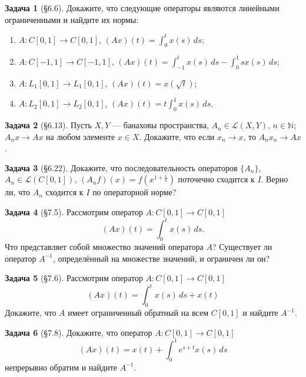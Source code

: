\documentclass{article}
\theoremstyle{definition}
\newtheorem{problem}{Задача}
\newcommand{\N}{\mathbb N}
\begin{document}
\begin{problem}[\S 6.6]
Докажите, что следующие операторы являются линейными ограниченными и найдите их нормы:
\begin{enumerate}
\item $A\colon C[0,1] \to C[0,1]$, \quad $(Ax)(t) = \int_0^t x(s)\, ds$;
\item $A\colon C[-1,1] \to C[-1,1]$, \quad $(Ax)(t) = \int_{-1}^t x(s)\, ds - \int_{0}^1 sx(s)\, ds$;
\item $A\colon L_1[0,1] \to L_1[0,1]$, \quad $(Ax)(t) = x(\sqrt{t})$;
\item $A\colon L_2[0,1] \to L_2[0,1]$, \quad $(Ax)(t) = t\int_0^1 x(s)\, ds$.
\end{enumerate}
\end{problem}

\begin{problem}[\S 6.13]
Пусть $X,Y$ --- банаховы пространства, $A_n \in \mathcal L(X,Y)$, $n\in \N$;
$A_n x \to Ax$ на любом элементе $x\in X$. Докажите, что если $x_n \to x$, то $A_n x_n \to A x$.
\end{problem}

\begin{problem}[\S 6.22]
Докажите, что последовательность операторов $\{A_n\}$, $A_n \in \mathcal L(C[0,1])$,
$(A_n f)(x) = f(x^{1+\frac{1}{n}})$ поточечно сходится к $I$.
Верно ли, что $A_n$ сходится к $I$ по операторной норме?
\end{problem}

\begin{problem}[\S 7.5]
Рассмотрим оператор $A\colon C[0,1] \to C[0,1]$
\begin{equation*}
(Ax)(t) = \int_0^t x(s) \, ds.
\end{equation*}
Что представляет собой множество значений оператора $A$?
Существует ли оператор $A^{-1}$, определённый на множестве значений,
и ограничен ли он?
\end{problem}

\begin{problem}[\S 7.6]
Рассмотрим оператор $A\colon C[0,1] \to C[0,1]$
\begin{equation*}
(Ax)(t) = \int_0^t x(s) \, ds + x(t)
\end{equation*}
Докажите, что $A$ имеет ограниченный обратный на всем $C[0,1]$ и найдите $A^{-1}$.
\end{problem}

\begin{problem}[\S 7.8]
Докажите, что оператор $A\colon C[0,1]\to C[0,1]$
\begin{equation*}
(Ax)(t) = x(t) + \int_0^1 e^{s+t} x(s) \, ds
\end{equation*}
непрерывно обратим и найдите $A^{-1}$.
\end{problem}
\end{document}
